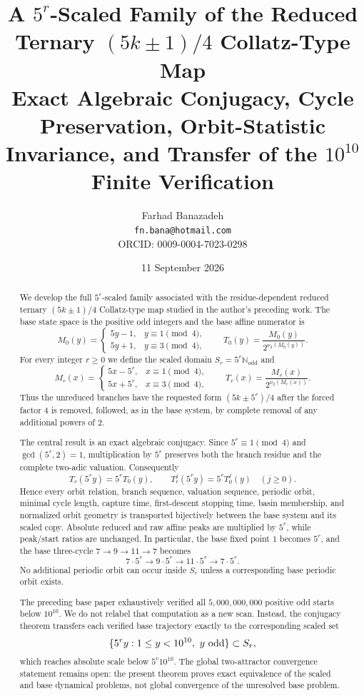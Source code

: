 \documentclass[11pt]{article}
\title{\textbf{A $5^r$-Scaled Family of the Reduced Ternary $(5k\pm1)/4$ Collatz-Type Map}\\
\large Exact Algebraic Conjugacy, Cycle Preservation, Orbit-Statistic Invariance, and Transfer of the $10^{10}$ Finite Verification}
\author{Farhad Banazadeh\\
\texttt{fn.bana@hotmail.com}\\
ORCID: 0009-0004-7023-0298}
\date{11 September 2026}
\theoremstyle{remark}
\newcommand{\vTwo}{\nu_2}
\newcommand{\Nodd}{\mathbb N_{\mathrm{odd}}}
\begin{document}
\maketitle

\begin{abstract}
We develop the full $5^r$-scaled family associated with the residue-dependent reduced ternary $(5k\pm1)/4$ Collatz-type map studied in the author's preceding work.  The base state space is the positive odd integers and the base affine numerator is
\[
M_0(y)=
\begin{cases}
5y-1,&y\equiv1\pmod4,\\
5y+1,&y\equiv3\pmod4,
\end{cases}
\qquad
T_0(y)=\frac{M_0(y)}{2^{\vTwo(M_0(y))}}.
\]
For every integer $r\ge0$ we define the scaled domain $S_r=5^r\Nodd$ and
\[
M_r(x)=
\begin{cases}
5x-5^r,&x\equiv1\pmod4,\\
5x+5^r,&x\equiv3\pmod4,
\end{cases}
\qquad
T_r(x)=\frac{M_r(x)}{2^{\vTwo(M_r(x))}}.
\]
Thus the unreduced branches have the requested form $(5k\pm5^r)/4$ after the forced factor $4$ is removed, followed, as in the base system, by complete removal of any additional powers of $2$.

The central result is an exact algebraic conjugacy.  Since $5^r\equiv1\pmod4$ and $\gcd(5^r,2)=1$, multiplication by $5^r$ preserves both the branch residue and the complete two-adic valuation.  Consequently
\[
T_r(5^r y)=5^rT_0(y),\qquad
T_r^j(5^r y)=5^rT_0^j(y)\quad(j\ge0).
\]
Hence every orbit relation, branch sequence, valuation sequence, periodic orbit, minimal cycle length, capture time, first-descent stopping time, basin membership, and normalized orbit geometry is transported bijectively between the base system and its scaled copy.  Absolute reduced and raw affine peaks are multiplied by $5^r$, while peak/start ratios are unchanged.  In particular, the base fixed point $1$ becomes $5^r$, and the base three-cycle $7\to9\to11\to7$ becomes
\[
7\cdot5^r\to9\cdot5^r\to11\cdot5^r\to7\cdot5^r.
\]
No additional periodic orbit can occur inside $S_r$ unless a corresponding base periodic orbit exists.

The preceding base paper exhaustively verified all $5,000,000,000$ positive odd starts below $10^{10}$.  We do not relabel that computation as a new scan.  Instead, the conjugacy theorem transfers each verified base trajectory exactly to the corresponding scaled set
\[
\{5^r y:1\le y<10^{10},\ y\ {\rm odd}\}\subset S_r,
\]
which reaches absolute scale below $5^r10^{10}$.  The global two-attractor convergence statement remains open: the present theorem proves exact equivalence of the scaled and base dynamical problems, not global convergence of the unresolved base problem.
\end{abstract}
\end{document}
